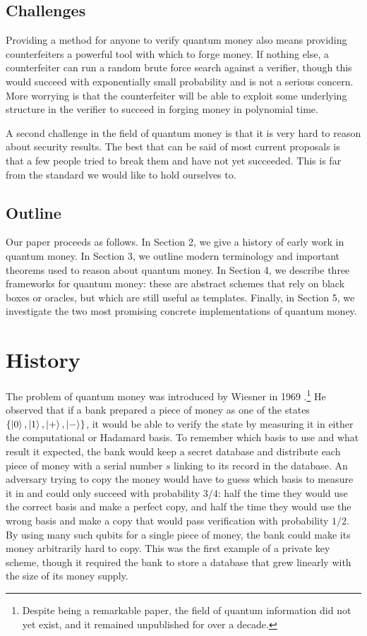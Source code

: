 \documentclass[12pt]{article}
\begin{document}
\subsection{Challenges}
Providing a method for anyone to verify quantum money also means providing counterfeiters a powerful tool with which to forge money.  If nothing else, a counterfeiter can run a random brute force search against a verifier, though this would succeed with exponentially small probability and is not a serious concern.  More worrying is that the counterfeiter will be able to exploit some underlying structure in the verifier to succeed in forging money in polynomial time.

A second challenge in the field of quantum money is that it is very hard to reason about security results.  The best that can be said of most current proposals is that a few people tried to break them and have not yet succeeded.  This is far from the standard we would like to hold ourselves to.

\subsection{Outline}
Our paper proceeds as follows.  In Section 2, we give a history of early work in quantum money.  In Section 3, we outline modern terminology and important theorems used to reason about quantum money.  In Section 4, we describe three frameworks for quantum money: these are abstract schemes that rely on black boxes or oracles, but which are still useful as templates.  Finally, in Section 5, we investigate the two most promising concrete implementations of quantum money.



\section{History}
The problem of quantum money was introduced by Wiesner in 1969 \cite{Wie83}.\footnote{Despite being a remarkable paper, the field of quantum information did not yet exist, and it remained unpublished for over a decade.}  He observed that if a bank prepared a piece of money as one of the states $\{\Ket{0},\Ket{1},\Ket{+},\Ket{-}\}$, it would be able to verify the state by measuring it in either the computational or Hadamard basis.  To remember which basis to use and what result it expected, the bank would keep a secret database and distribute each piece of money with a serial number $s$ linking to its record in the database.  An adversary trying to copy the money would have to guess which basis to measure it in and could only succeed with probability $3/4$: half the time they would use the correct basis and make a perfect copy, and half the time they would use the wrong basis and make a copy that would pass verification with probability $1/2$.  By using many such qubits for a single piece of money, the bank could make its money arbitrarily hard to copy.  This was the first example of a private key scheme, though it required the bank to store a database that grew linearly with the size of its money supply.
\end{document}
